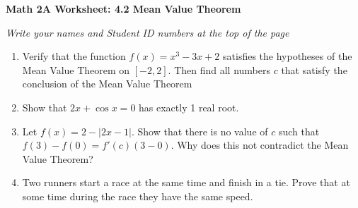 \documentclass[12pt,fleqn]{article}
\begin{document}
\begin{center}
	\textbf{Math 2A Worksheet: 4.2 Mean Value Theorem}
\end{center}

\emph{Write your names and Student ID numbers at the top of the page}


\begin{enumerate}

\item Verify that the function $f(x)=x^3-3x+2$ satisfies the hypotheses of the Mean Value Theorem on $[-2,2]$.  Then find all numbers $c$ that satisfy the conclusion of the Mean Value Theorem\vfill

\item Show that $2x+\cos x=0$ has exactly 1 real root.\vfill

\newpage

\item Let $f(x)=2-|2x-1|$.  Show that there is no value of $c$ such that $f(3)-f(0)=f'(c)(3-0)$.  Why does this not contradict the Mean Value Theorem?\vfill


\item Two runners start a race at the same time and finish in a tie.  Prove that at some time during the race they have the same speed.\vfill


\end{enumerate}
\end{document}
